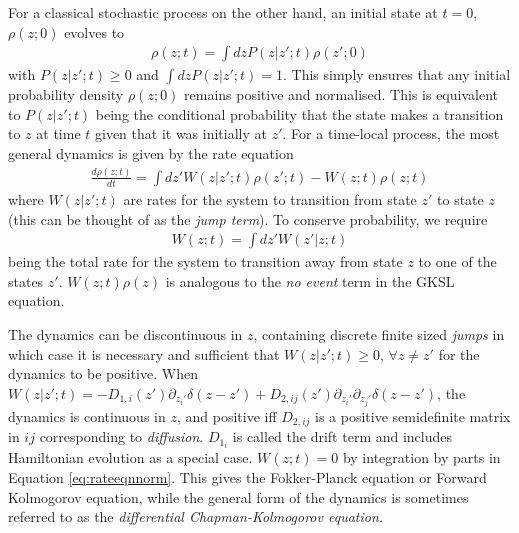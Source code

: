 \documentclass[aps,pra,showpacs,citeautoscript,amsmath,amssymb,floatfix,superscriptaddress,bbm, verbatim,amsfonts,changes,12pt,nofootinbib,longbibliography]{revtex4-2}
\def\z{{z}}
\def\rate{{W}}
\def\t0{0}
\begin{document}
For a classical stochastic process on the other hand, an initial state at $t=\t0$, $\rho(\z;\t0)$ evolves to
\begin{align}
  \rho(\z;t)=
\int d\z  
  P(\z|\z';t)\rho(\z';\t0)
  \label{eq:c-non-markovian}
\end{align}
with $P(\z|\z';t)\geq 0$ 
and 
$\int d\z P(\z|\z';t)=1$. This simply ensures that any initial probability density
$\rho(\z;0)$ remains positive
and normalised. This is equivalent to $P(\z|\z';t)$ being the conditional probability that the state makes a transition to $\z$ at time $t$ given that it was initially at $\z'$. For a time-local process, the most general dynamics is given by the rate equation
\begin{align}
    \frac{d\rho(\z;t)}{dt}=\int d{\z'} \rate(\z|\z';t) \rho(\z';t) - \rate(\z;t)\rho(\z;t)
    \label{eq:rate-eqn}
  \end{align}
  where $\rate(\z|\z';t)$ are rates for the system to transition from state $\z'$ to state $\z$ (this can be thought of as the {\it jump term}). To conserve probability, we require 
  \begin{align}
  \rate(\z;t)=\int d{\z'} \rate(\z'|\z;t)
  \label{eq:rateeqnnorm}
  \end{align} 
  being the
  total rate for the system to transition away from state $\z$ to one of the states $\z'$.
  $W(\z;t) \rho(\z)$  is analogous to the {\it no event} term in the GKSL equation. 
 
 The dynamics can be discontinuous in $\z$, containing discrete finite sized {\it jumps} in which case
 it is necessary and sufficient that $\rate(\z|\z';t)\geq 0$, $\forall z\neq z'$ for the dynamics to be positive.
 When  
  $W(\z|\z';t)=-D_{1,i}(\z')\partial_{z_i'}\delta(\z-\z')+
  D_{2,ij}(\z')\partial_{z_i'}\partial_{z_j'}\delta(\z-\z')$, the dynamics is continuous in $\z$, and  positive iff
  $D_{2,ij}$ is a positive semidefinite matrix in $ij$ corresponding to {\it diffusion}. $D_{1_i}$ is called the drift term\label{par:drift} and includes Hamiltonian evolution as a special case. $\rate(\z;t)=0$ by integration by parts in Equation \eqref{eq:rateeqnnorm}. 
 This gives the Fokker-Planck equation or Forward Kolmogorov equation, while the general form of the dynamics
is sometimes referred to as the {\it differential Chapman-Kolmogorov equation\cite{gardiner2004handbook}.}
\end{document}
